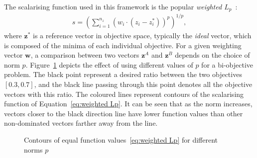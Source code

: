 \documentclass[10pt]{llncs}
\newcommand{\brs}[1]{\left[{#1}\right]} %
\newcommand{\brr}[1]{{\left({#1}\right)}} %
\newcommand{\vz}{\ensuremath{\mathbf{z}}} %
\newcommand{\vw}{\ensuremath{\mathbf{w}}} %
\begin{document}
The scalarising function used in this framework is the popular \emph{weighted $L_p$}~\cite{koski1987norm,Marler2004Survey}:
\begin{align}
\label{eq:weighted Lp}
	s = \brr{\sum_{i=1}^{n_z} \brr{w_i\cdot \brr{z_i-z_i^*}}^p}^{1/p},
\end{align}
where $\mathbf{z^*}$ is a reference vector in objective space, typically the \emph{ideal} vector, which is composed of the minima of each individual objective. For a given weighting vector $\vw$, a comparison between two vectors $\vz^{A}$ and $\vz^{B}$ depends on the choice of norm $p$. Figure~\ref{fig:weightedLp} depicts the effect of using different values of $p$ for a bi-objective problem. The black point represent a desired ratio between the two objectives $\brs{0.3,0.7}$, and the black line passing through this point denotes all the objective vectors with this ratio. The coloured lines represent contours of the scalarising function of Equation~\eqref{eq:weighted Lp}. It can be seen that as the norm increases, vectors closer to the black direction line have lower function values than other non-dominated vectors farther away from the line.
\begin{figure}%
\centering
{}
\caption{Contours of equal function values~\eqref{eq:weighted Lp} for different norms $p$}
\label{fig:weightedLp}
\end{figure}
\end{document}

